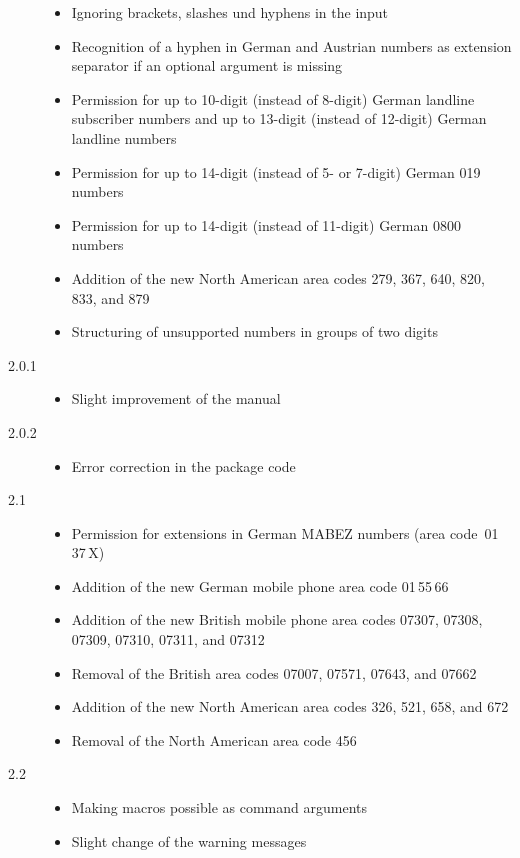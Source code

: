 \documentclass[numbers=noenddot]{scrreprt}
\begin{document}
\begin{description}
\begin{itemize}
\item Ignoring brackets, slashes und hyphens in the input
\item Recognition of a hyphen in German and Austrian numbers as extension separator if an optional argument is missing
\item Permission for up to 10-digit (instead of 8-digit) German landline subscriber numbers and up to 13-digit (instead of 12-digit) German landline numbers
\item Permission for up to 14-digit (instead of 5- or 7-digit) German 019 numbers
\item Permission for up to 14-digit (instead of 11-digit) German 0800 numbers
\item Addition of the new North American area codes 279, 367, 640, 820, 833, and 879
\item Structuring of unsupported numbers in groups of two digits
\end{itemize}
\item[2.0.1] 
\begin{itemize}
\item Slight improvement of the manual
\end{itemize}
\item[2.0.2] 
\begin{itemize}
\item Error correction in the package code
\end{itemize}
\item[2.1] 
\begin{itemize}
\item Permission for extensions in German MABEZ numbers (area code~01\,37\,X)
\item Addition of the new German mobile phone area code 01\,55\,66
\item Addition of the new British mobile phone area codes 07307, 07308, 07309, 07310, 07311, and 07312
\item Removal of the British area codes 07007, 07571, 07643, and 07662
\item Addition of the new North American area codes 326, 521, 658, and 672
\item Removal of the North American area code 456
\end{itemize}
\item[2.2] 
\begin{itemize}
\item Making macros possible as command arguments
\item Slight change of the warning messages

\end{itemize}
\end{description}
\end{document}

